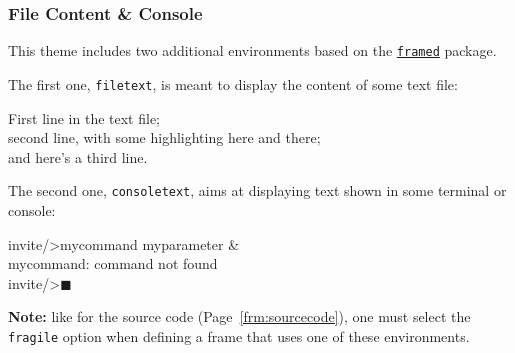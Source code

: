 \documentclass[10pt,    %
    english,            %
    xcolor=table,       %
    envcountsect,       %
    aspectratio=43      %
]{beamer}
\begin{document}
\begin{frame}[fragile]
    \frametitle{File Content \& Console}
    
    This theme includes two additional environments based on the \href{https://ctan.org/pkg/framed?lang=en}{\texttt{framed}} package.
    
    \medskip
    The first one, \texttt{filetext}, is meant to display the content of some text file:
    
    \begin{filetext}[caption={Content of some text file.},label={fil:example}]
First line in the text file; \\
second line, with some highlighting \textcolor{fgRed}{here} and \colorbox{fgRed}{there}; \\
and here's a third line.
    \end{filetext}
    
    \vspace{-0.50cm}
    The second one, \texttt{consoletext}, aims at displaying text shown in some terminal or console:
    
    \begin{consoletext}[caption={Example of command lines.},label={con:example}]
invite/>mycommand myparameter \& \\
mycommand: command not found \\
invite/>$\blacksquare$
    \end{consoletext}
    
    \vspace{-0.50cm}
    {\small \textbf{Note:} like for the source code (Page~\ref{frm:sourcecode}), one must select the \texttt{fragile} option when defining a frame that uses one of these environments.}
    
\end{frame}







\end{document}
